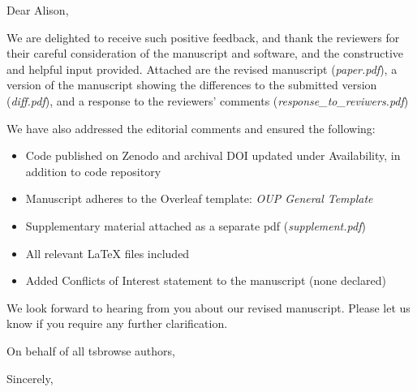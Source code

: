 \documentclass{letter}
\begin{document}
\begin{letter}{}

\opening{Dear Alison,}

We are delighted to receive such positive feedback, and thank the reviewers for their 
careful consideration of the manuscript and software, and the constructive and helpful 
input provided. Attached are the revised manuscript (\textit{paper.pdf}), 
a version of the manuscript showing the differences to the submitted version 
(\textit{diff.pdf}), and a response to the reviewers' comments 
(\textit{response\_to\_reviwers.pdf})

We have also addressed the editorial comments and ensured the following:
\begin{itemize}
    \item Code published on Zenodo and archival DOI updated 
    under Availability, in addition to code repository
    \item Manuscript adheres to the Overleaf template: \textit{OUP General Template}
    \item Supplementary material attached as a separate pdf (\textit{supplement.pdf})
    \item All relevant LaTeX files included
    \item Added Conflicts of Interest statement to the manuscript (none declared)
\end{itemize}

We look forward to hearing from you about our revised manuscript. Please let us know if you require any 
further clarification.

On behalf of all tsbrowse authors,
\closing{Sincerely,}

\end{letter}
\end{document}
